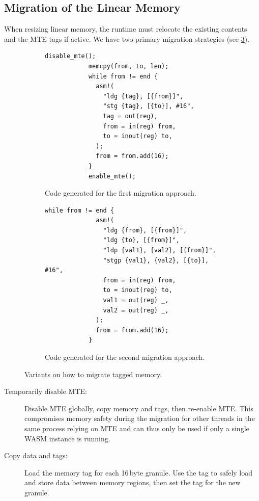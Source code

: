 \subsection{Migration of the Linear Memory}
\label{subsec:migration-of-the-linear-memory}

When resizing linear memory, the runtime must relocate the existing contents and the \ac{MTE} tags if active.
We have two primary migration strategies (see \cref{fig:migrating-memory}).

\begin{figure}[h]
    \centering
    \begin{subfigure}[T]{0.45\textwidth}
        \centering
        \begin{lstlisting}[frame=h,style=customc,label={lst:migrating-memory-disable}]
            disable_mte();
            memcpy(from, to, len);
            while from != end {
              asm!(
                "ldg {tag}, [{from}]",
                "stg {tag}, [{to}], #16",
                tag = out(reg),
                from = in(reg) from,
                to = inout(reg) to,
              );
              from = from.add(16);
            }
            enable_mte();
        \end{lstlisting}
        \caption{Code generated for the first migration approach.}
        \label{fig:migrating-memory-disable}
    \end{subfigure}
    \hfill
    \begin{subfigure}[T]{0.45\textwidth}
        \centering
        \begin{lstlisting}[frame=h,style=customc,label={lst:migrating-memory-tags}]
            while from != end {
              asm!(
                "ldg {from}, [{from}]",
                "ldg {to}, [{from}]",
                "ldp {val1}, {val2}, [{from}]",
                "stgp {val1}, {val2}, [{to}], #16",
                from = in(reg) from,
                to = inout(reg) to,
                val1 = out(reg) _,
                val2 = out(reg) _,
              );
              from = from.add(16);
            }
        \end{lstlisting}
        \caption{Code generated for the second migration approach.}
        \label{fig:migrating-memory-tags}
    \end{subfigure}
    \caption{Variants on how to migrate tagged memory.}
    \label{fig:migrating-memory}
\end{figure}

\begin{description}
    \item[Temporarily disable \ac{MTE}:]
    Disable \ac{MTE} globally, copy memory and tags, then re-enable \ac{MTE}.
    This compromises memory safety during the migration for other threads in the same process relying on \ac{MTE} and can thus only be used if only a single \ac{WASM} instance is running.

    \item[Copy data and tags:]
    Load the memory tag for each 16\,byte granule.
    Use the tag to safely load and store data between memory regions, then set the tag for the new granule.

\end{description}

